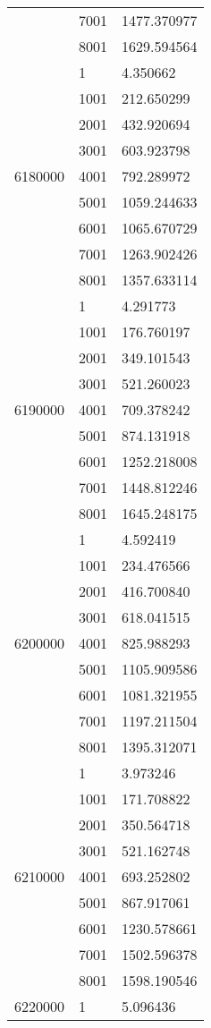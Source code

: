 \begin{table}[htb!]
\begin{tabular}{lll}
 & 7001 & 1477.370977 \\
 & 8001 & 1629.594564 \\
\multirow[c]{9}{*}{6180000} & 1 & 4.350662 \\
 & 1001 & 212.650299 \\
 & 2001 & 432.920694 \\
 & 3001 & 603.923798 \\
 & 4001 & 792.289972 \\
 & 5001 & 1059.244633 \\
 & 6001 & 1065.670729 \\
 & 7001 & 1263.902426 \\
 & 8001 & 1357.633114 \\
\multirow[c]{9}{*}{6190000} & 1 & 4.291773 \\
 & 1001 & 176.760197 \\
 & 2001 & 349.101543 \\
 & 3001 & 521.260023 \\
 & 4001 & 709.378242 \\
 & 5001 & 874.131918 \\
 & 6001 & 1252.218008 \\
 & 7001 & 1448.812246 \\
 & 8001 & 1645.248175 \\
\multirow[c]{9}{*}{6200000} & 1 & 4.592419 \\
 & 1001 & 234.476566 \\
 & 2001 & 416.700840 \\
 & 3001 & 618.041515 \\
 & 4001 & 825.988293 \\
 & 5001 & 1105.909586 \\
 & 6001 & 1081.321955 \\
 & 7001 & 1197.211504 \\
 & 8001 & 1395.312071 \\
\multirow[c]{9}{*}{6210000} & 1 & 3.973246 \\
 & 1001 & 171.708822 \\
 & 2001 & 350.564718 \\
 & 3001 & 521.162748 \\
 & 4001 & 693.252802 \\
 & 5001 & 867.917061 \\
 & 6001 & 1230.578661 \\
 & 7001 & 1502.596378 \\
 & 8001 & 1598.190546 \\
\multirow[c]{9}{*}{6220000} & 1 & 5.096436 \\

\end{tabular}
\end{table}

